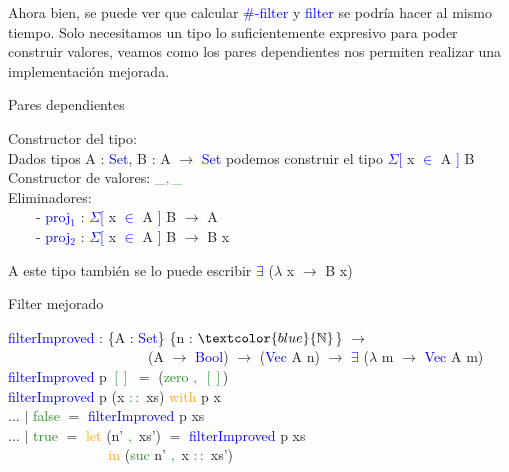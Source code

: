 \documentclass[xcolor=dvipsnames]{beamer} %
\newcommand{\cf}[1]{\textcolor{blue}{#1}}
\newcommand{\ct}[1]{\textcolor{blue}{#1}}
\newcommand{\cc}[1]{\textcolor{ForestGreen}{#1}}
\newcommand{\ck}[1]{\textcolor{orange}{#1}}
\newcommand{\N}{\ct{\mathbb{N}}}
\newcommand{\ra}{\rightarrow}
\newcommand{\T}{ \ \ \ \ }
\begin{document}
\begin{frame}

\begin{block}{}
Ahora bien, se puede ver que calcular \cf{$\#$-filter} y \cf{filter} se
podría hacer al mismo tiempo. Solo necesitamos un tipo lo suficientemente
expresivo para poder construir valores, veamos como los pares dependientes
nos permiten realizar una implementación mejorada.
\end{block}

\pause

\begin{block}{Pares dependientes}\small

Constructor del tipo:\\ 
Dados tipos A : \ct{Set}, B : A $\ra$ \ct{Set} podemos construir el tipo
\ct{$\Sigma$[} x \ct{$\in$} A \ct{]} B\\
Constructor de valores: \cc{\_$,$\_}\\
Eliminadores: \\
\T - \cf{proj$_1$} : \ct{$\Sigma$[} x \ct{$\in$} A \ct{]} B $\ra$ A\\
\T - \cf{proj$_2$} : \ct{$\Sigma$[} x \ct{$\in$} A \ct{]} B $\ra$ B x\\

\end{block}

\pause

\begin{block}{}
 A este tipo también se lo puede escribir \ct{$\exists$} ($\lambda$ x $\ra$ B x)
\end{block}


\end{frame}

\begin{frame}

\begin{block}{Filter mejorado}\small

\cf{filterImproved} : \{A : \ct{Set}\} \{n : $\N$\} $\ra$\\
\T \T \T \T \ \ (A $\ra$ \ct{Bool}) $\ra$ (\ct{Vec} A n) $\ra$ \ct{$\exists$} ($\lambda$ m $\ra$ \ct{Vec} A m)\\
\pause
\cf{filterImproved} p \cc{$[]$} $=$ (\cc{zero} \cc{$,$} \cc{$[]$})\\
\cf{filterImproved} p (x \cc{$::$} xs) \ck{with} p x\\
$\ldots$ $|$ \cc{false} $=$ \cf{filterImproved} p xs\\
$\ldots$ $|$ \cc{true} $=$ \ck{let} (n' \cc{$,$} xs') $=$ \cf{filterImproved} p xs\\
\T \T \T  \ \ck{in} (\cc{suc} n' \cc{$,$} x \cc{$::$} xs')

\end{block}

\end{frame}
\end{document}
